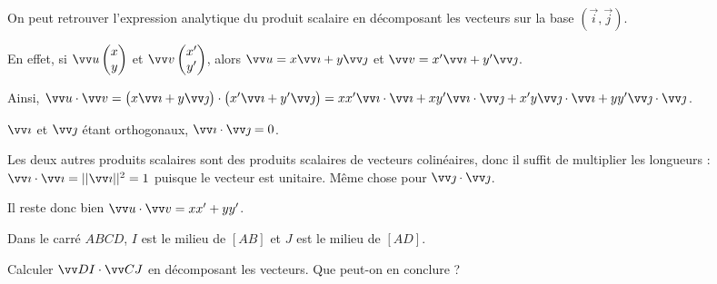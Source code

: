 \documentclass[a4paper,11pt]{article}
\begin{document}
\begin{cexemple}
On peut retrouver l'expression analytique du produit scalaire en décomposant les vecteurs sur la base $(\vec{i},\vec{j})$.

En effet, si $\coord{u}{x}{y}$ et $\coord{v}{x'}{y'}$, alors $\vect{u}=x\vect{\imath}+y\vect{\jmath}$ et $\vect{v}=x'\vect{\imath}+y'\vect{\jmath}$.

Ainsi, $\vect{u}\cdot\vect{v}=\big(x\vect{\imath}+y\vect{\jmath}\big)\cdot\big(x'\vect{\imath}+y'\vect{\jmath}\big)=xx'\vect{\imath}\cdot\vect{\imath}+xy'\vect{\imath}\cdot\vect{\jmath}+x'y\vect{\jmath}\cdot\vect{\imath}+yy'\vect{\jmath}\cdot\vect{\jmath}$.

$\vect{\imath}$ et $\vect{\jmath}$ étant orthogonaux, $\vect{\imath}\cdot\vect{\jmath}=0$.

Les deux autres produits scalaires sont des produits scalaires de vecteurs colinéaires, donc il suffit de multiplier les longueurs : $\vect{\imath}\cdot\vect{\imath}=||\vect{\imath}||^2=1$ puisque le vecteur est unitaire. Même chose pour $\vect{\jmath}\cdot\vect{\jmath}$.

Il reste donc bien $\vect{u}\cdot\vect{v}=xx'+yy'$.
\end{cexemple}

\begin{cexercice}
Dans le carré $ABCD$, $I$ est le milieu de $[AB]$ et $J$ est le milieu de $[AD]$.

Calculer $\vect{DI}\cdot\vect{CJ}$ en décomposant les vecteurs. Que peut-on en conclure ?
\end{cexercice}
\end{document}
